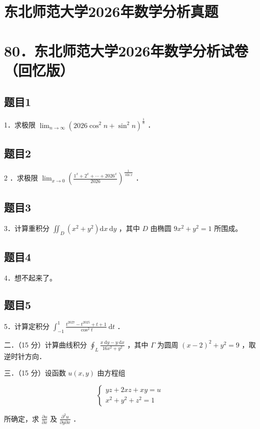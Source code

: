 \documentclass{article}
\begin{document}
\section*{东北师范大学2026年数学分析真题}
\section*{80．东北师范大学2026年数学分析试卷（回忆版）}

\subsection{题目1}
1．求极限 \(\lim _{n \rightarrow \infty}\left(2026 \cos ^{2} n+\sin ^{2} n\right)^{\frac{1}{n}}\) ．

\subsection{题目2}
2 ．求极限 \(\lim _{x \rightarrow 0}\left(\frac{1^{x}+2^{x}+\cdots+2026^{x}}{2026}\right)^{\frac{1}{\sin x}}\) ．

\subsection{题目3}
3．计算重积分 \(\iint_{D}\left(x^{2}+y^{2}\right) \mathrm{d} x \mathrm{~d} y\) ，其中 \(D\) 由椭圆 \(9 x^{2}+y^{2}=1\) 所围成。

\subsection{题目4}
4．想不起来了。

\subsection{题目5}
5．计算定积分 \(\int_{-1}^{1} \frac{t^{2027}-t^{2025}+t+1}{\cos ^{2} t} \mathrm{~d} t\) ．

二．（15 分）计算曲线积分 \(\oint_{L} \frac{x \mathrm{~d} y-y \mathrm{~d} x}{16 x^{2}+y^{2}}\) ，其中 \(\Gamma\) 为圆周 \((x-2)^{2}+y^{2}=9\) ，取逆时针方向．

三．（15 分）设函数 \(u(x, y)\) 由方程组

\[
\left\{\begin{array}{l}
y z+2 x z+x y=u \\
x^{2}+y^{2}+z^{2}=1
\end{array}\right.
\]

所确定，求 \(\frac{\partial u}{\partial x}\) 及 \(\frac{\partial^{2} u}{\partial y \partial x}\) ．
\end{document}
